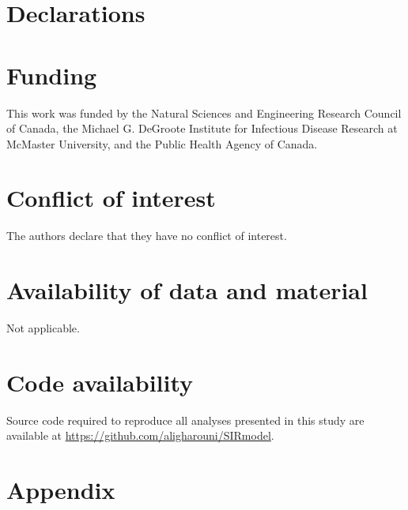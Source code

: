 \documentclass[smallextended]{svjour3}       %
\DeclareRobustCommand\_{\ifmmode\expandafter\subtxt\else\textunderscore\fi}
\begin{document}

%
\section*{Declarations}

\section*{Funding}

This work was funded by the Natural Sciences and Engineering
Research Council of Canada, the Michael G. DeGroote Institute for Infectious
Disease Research at McMaster University, and the Public Health Agency of
Canada.

\section*{Conflict of interest}

The authors declare that they have no conflict of interest.

\section*{Availability of data and material}

Not applicable.

\section*{Code availability} 

Source code required to reproduce all analyses presented in this study are available at \url{https://github.com/aligharouni/SIRmodel}.


\clearpage
\appendix
\section{Appendix}
\label{appe}
\end{document}
